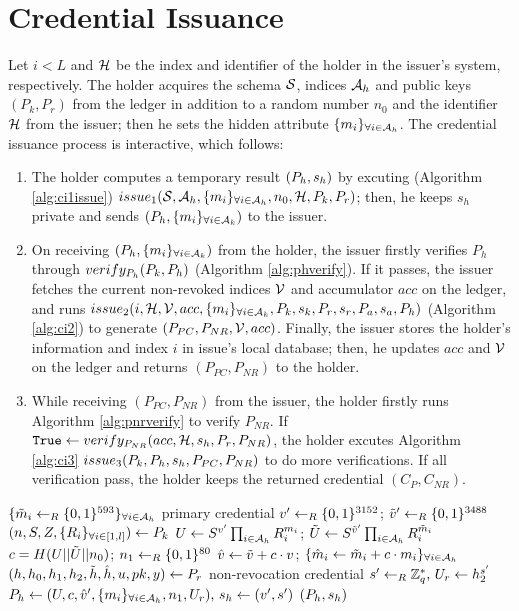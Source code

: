 \documentclass{article}
\begin{document}
\section{Credential Issuance}
Let $i<L$ and $\mathcal{H}$ be the index and identifier of the holder in the issuer's system, respectively. The holder acquires the schema $\mathcal{S}$, indices $\mathcal{A}_{h}$ and public keys $(P_{k}, P_{r})$ from the ledger in addition to a random number $n_0$ and the identifier $\mathcal{H}$ from the issuer; then he sets the hidden attribute $\{m_i\}_{\forall i\in \mathcal{A}_{h}}$. The credential issuance process is interactive, which follows: 
\begin{enumerate}
	\item The holder computes a temporary result $(P_{h}, s_{h})$ by excuting (Algorithm \ref{alg:ci1issue}) $\issuelp$; then, he keeps $s_{h}$ private and sends $(P_{h}, \{m_i\}_{\forall i\in \mathcal{A}_{k} })$ to the issuer.
	\item On receiving $(P_{h}, \{m_i\}_{\forall i\in \mathcal{A}_{k} })$ from the holder, the issuer firstly verifies $P_{h}$ through $verify_{P_{h}}(P_{k}, P_{h}) $ (Algorithm \ref{alg:phverify}). If it passes, the issuer fetches the current non-revoked indices $\mathcal{V}$ and accumulator $acc$ on the ledger, and runs $issue_{2}(i, \mathcal{H}, \mathcal{V}, acc, \{m_i\}_{\forall i\in \mathcal{A}_{k} }, P_{k}, s_{k}, P_{r}, s_{r}, P_{a}, s_{a}, P_{h})$ (Algorithm \ref{alg:ci2}) to generate $(P_{PC}, P_{NR}, \mathcal{V}, acc)$. Finally, the issuer stores the holder’s information and index $i$ in issue’s local database; then, he updates $acc$ and $\mathcal{V}$ on the ledger and returns $(P_{PC}, P_{NR})$ to the holder.
	\item While receiving $(P_{PC}, P_{NR})$ from the issuer, the holder firstly runs Algorithm \ref{alg:pnrverify} to verify $P_{NR}$. If $\texttt{True} \leftarrow verify_{P_{NR}}(acc, \mathcal{H}, s_{h}, P_{r}, P_{NR}) $, the holder excutes Algorithm \ref{alg:ci3} $issue_{3}(P_{k}, P_{h}, s_{h}, P_{PC}, P_{NR})$ to do more verifications. If all verification pass, the holder keeps the returned credential $(C_{P}, C_{NR})$.
\end{enumerate}

\begin{algorithm}
\caption{$\issuelp$}
\label{alg:ci1issue}
\begin{algorithmic}
	\State $\{\tilde{m}_i\leftarrow _{R} \{0, 1\}^{593}\}_{\forall i\in \mathcal{A}_{h}}$
	\Comment primary credential
	\State $v'\leftarrow _{R} \{0, 1\}^{3152}$; $\tilde{v}'\leftarrow _{R} \{0, 1\}^{3488}$
	\State $(n, S, Z, \{R_i\}_{\forall i\in [1,l]}) \leftarrow P_{k}$
	\State $U\leftarrow S^{v'}\prod _{i\in \mathcal{A}_{h}}R_{i}^{m_{i}}$; $\tilde{U}\leftarrow S^{\tilde{v}'}\prod _{i\in \mathcal{A}_{h}}R_{i}^{\tilde{m}_{i}}$
	\State $c = H(U||\tilde{U}||n_{0})$; $n_1\leftarrow _{R} \{0, 1\}^{80}$
	\State $\hat{v}_{}\leftarrow \tilde{v}_{} + c\cdot v_{}$; $\{\hat{m}_{i}\leftarrow \tilde{m}_{i} + c\cdot m_{i}\}_{\forall i\in \mathcal{A}_{h}}$
	\State $(h, h_0, h_1, h_2, \tilde{h}, \hat{h}, u, pk, y) \leftarrow P_{r}$
	\Comment non-revocation credential
	\State $s'\leftarrow _{R} \mathbb{Z}_{q}^{*}\mbox{, }U_{r}\leftarrow h_{2}^{s'}$
	\State $P_{h}\leftarrow {(U, c, \hat{v}', \{m_{i}\}_{\forall i\in \mathcal{A}_{h}},n_{1}, U_{r})}\mbox{, }s_{h}\leftarrow {(v', s')}$
	\State \Return $(P_{h}, s_{h})$
\end{algorithmic}
\end{algorithm}
\end{document}
